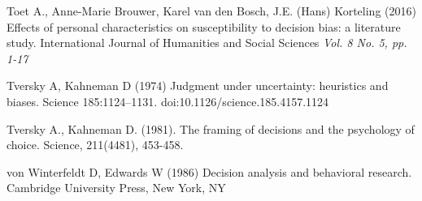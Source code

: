 \documentclass[a4paper,11pt]{article}
\begin{document}
\begin{thebibliography}{}
Toet A., Anne-Marie Brouwer, Karel van den Bosch, J.E. (Hans) Korteling (2016) Effects of personal characteristics on susceptibility to decision bias: a literature study. International Journal of Humanities and Social Sciences \textit{Vol. 8 No. 5, pp. 1-17}

Tversky A, Kahneman D (1974) Judgment under uncertainty: heuristics and biases. Science
185:1124–1131. doi:10.1126/science.185.4157.1124

Tversky A., Kahneman D. (1981). The framing of decisions and the psychology of choice. Science, 211(4481), 453-458.

von Winterfeldt D, Edwards W (1986) Decision analysis and behavioral research. Cambridge University Press, New York, NY



\end{thebibliography}
\end{document}
